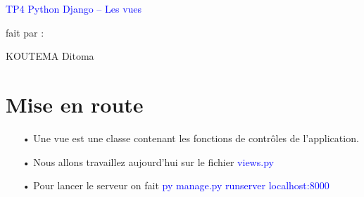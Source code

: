 \documentclass[10pt,a4paper]{article}
\author{KOUTEMA Ditoma}
\begin{document}

\begin{shadedbox}
\begin{center}
\huge \textcolor{blue}{TP4 Python Django – Les vues}
\end{center}
\end{shadedbox}
\large{\begin{center}
fait par : 
\end{center}}
\begin{center}
\huge{KOUTEMA Ditoma}
\end{center}
\newpage
\tableofcontents
\newpage

\section{Mise en route}
\begin{enumerate}
\item[•] Une vue est une classe contenant les fonctions de contrôles de  l'application.
\item[•] Nous allons travaillez aujourd'hui sur le fichier \textcolor{blue}{views.py}
\item[•] Pour lancer le serveur on fait \textcolor{blue}{py manage.py runserver localhost:8000}

\end{enumerate}
\end{document}
